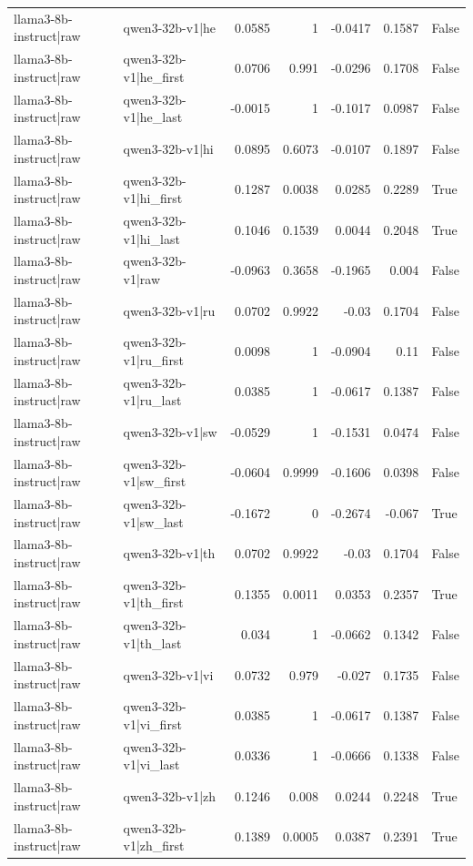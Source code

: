 \begin{table}
\begin{tabular}{l l r r r r l}
llama3-8b-instruct|raw & qwen3-32b-v1|he & 0.0585 & 1 & -0.0417 & 0.1587 & False \\
llama3-8b-instruct|raw & qwen3-32b-v1|he_first & 0.0706 & 0.991 & -0.0296 & 0.1708 & False \\
llama3-8b-instruct|raw & qwen3-32b-v1|he_last & -0.0015 & 1 & -0.1017 & 0.0987 & False \\
llama3-8b-instruct|raw & qwen3-32b-v1|hi & 0.0895 & 0.6073 & -0.0107 & 0.1897 & False \\
llama3-8b-instruct|raw & qwen3-32b-v1|hi_first & 0.1287 & 0.0038 & 0.0285 & 0.2289 & True \\
llama3-8b-instruct|raw & qwen3-32b-v1|hi_last & 0.1046 & 0.1539 & 0.0044 & 0.2048 & True \\
llama3-8b-instruct|raw & qwen3-32b-v1|raw & -0.0963 & 0.3658 & -0.1965 & 0.004 & False \\
llama3-8b-instruct|raw & qwen3-32b-v1|ru & 0.0702 & 0.9922 & -0.03 & 0.1704 & False \\
llama3-8b-instruct|raw & qwen3-32b-v1|ru_first & 0.0098 & 1 & -0.0904 & 0.11 & False \\
llama3-8b-instruct|raw & qwen3-32b-v1|ru_last & 0.0385 & 1 & -0.0617 & 0.1387 & False \\
llama3-8b-instruct|raw & qwen3-32b-v1|sw & -0.0529 & 1 & -0.1531 & 0.0474 & False \\
llama3-8b-instruct|raw & qwen3-32b-v1|sw_first & -0.0604 & 0.9999 & -0.1606 & 0.0398 & False \\
llama3-8b-instruct|raw & qwen3-32b-v1|sw_last & -0.1672 & 0 & -0.2674 & -0.067 & True \\
llama3-8b-instruct|raw & qwen3-32b-v1|th & 0.0702 & 0.9922 & -0.03 & 0.1704 & False \\
llama3-8b-instruct|raw & qwen3-32b-v1|th_first & 0.1355 & 0.0011 & 0.0353 & 0.2357 & True \\
llama3-8b-instruct|raw & qwen3-32b-v1|th_last & 0.034 & 1 & -0.0662 & 0.1342 & False \\
llama3-8b-instruct|raw & qwen3-32b-v1|vi & 0.0732 & 0.979 & -0.027 & 0.1735 & False \\
llama3-8b-instruct|raw & qwen3-32b-v1|vi_first & 0.0385 & 1 & -0.0617 & 0.1387 & False \\
llama3-8b-instruct|raw & qwen3-32b-v1|vi_last & 0.0336 & 1 & -0.0666 & 0.1338 & False \\
llama3-8b-instruct|raw & qwen3-32b-v1|zh & 0.1246 & 0.008 & 0.0244 & 0.2248 & True \\
llama3-8b-instruct|raw & qwen3-32b-v1|zh_first & 0.1389 & 0.0005 & 0.0387 & 0.2391 & True \\

\end{tabular}
\end{table}
